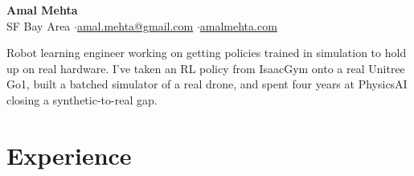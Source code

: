 \documentclass[10pt]{article}
\begin{document}
\fontsize{9.8}{10.8}\selectfont

\begin{center}
{\LARGE\bfseries Amal Mehta}\\[3pt]
SF Bay Area \quad$\cdot$\quad \href{mailto:amal.mehta@gmail.com}{amal.mehta@gmail.com} \quad$\cdot$\quad \href{https://amalmehta.com/}{amalmehta.com}
\end{center}

Robot learning engineer working on getting policies trained in simulation to hold up on real hardware. I've taken an RL policy from IsaacGym onto a real Unitree Go1, built a batched simulator of a real drone, and spent four years at PhysicsAI closing a synthetic-to-real gap.

\section*{Experience}
\end{document}
